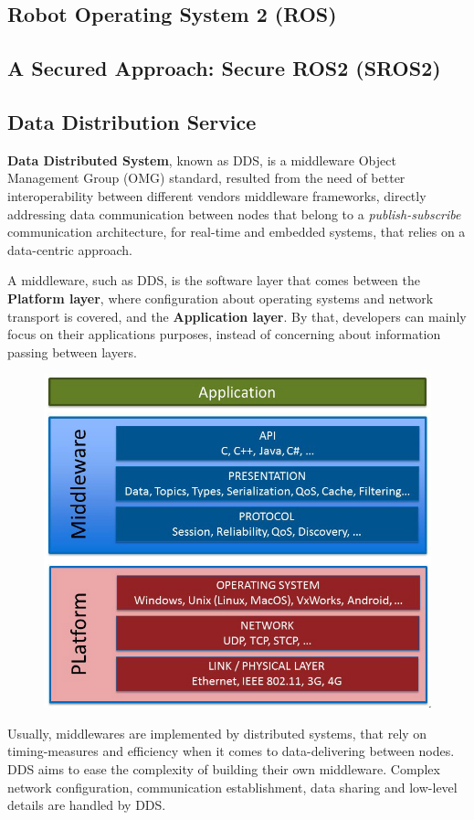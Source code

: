 \subsection{Robot Operating System 2 (ROS)}

\subsection{A Secured Approach: Secure ROS2 (SROS2)}

\subsection{Data Distribution Service}

\textbf{Data Distributed System}, known as DDS, is a middleware Object Management Group (OMG) standard, resulted from the need of better interoperability between different vendors middleware frameworks, directly addressing data communication between nodes that belong to a \textit{publish-subscribe} communication architecture, for real-time and embedded systems, that relies on a data-centric approach. 
            
A middleware, such as DDS, is the software layer that comes between the \textbf{Platform layer}, where configuration about operating systems and network transport is covered, and the \textbf{Application layer}. By that, developers can mainly focus on their applications purposes, instead of concerning about information passing between layers.

\begin{figure}[H]
        \centering
         \includegraphics[width=0.4\linewidth]{images/middleware.png}
\end{figure}

Usually, middlewares are implemented by distributed systems, that rely on timing-measures and efficiency when it comes to data-delivering between nodes. DDS aims to ease the complexity of building their own middleware. Complex network configuration, communication establishment, data sharing and low-level details are handled by DDS.

